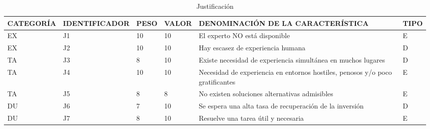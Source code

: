 \documentclass[a4paper,12pt]{article}
\begin{document}
\begin{table}[h]
	\centering
	\begin{tabular}{|l|l|l|l|p{4cm}|l|}
		\hline
		\scriptsize CATEGORÍA & \scriptsize IDENTIFICADOR & \scriptsize PESO & \scriptsize VALOR & \scriptsize DENOMINACIÓN DE LA CARACTERÍSTICA                                 & \scriptsize TIPO \\ \hline
		EX                    & J1                        & 10               & 10                & El experto NO está disponible                                                 & E                \\ \hline
		EX                    & J2                        & 10               & 10                & Hay escasez de experiencia humana                                             & D                \\ \hline
		TA                    & J3                        & 8                & 10                & Existe necesidad de experiencia simultánea en muchos lugares                  & D                \\ \hline
		TA                    & J4                        & 10               & 10                & Necesidad de experiencia en entornos hostiles, penosos y/o poco gratificantes & E                \\ \hline
		TA                    & J5                        & 8                & 8                 & No existen soluciones alternativas admisibles                                 & E                \\ \hline
		DU                    & J6                        & 7                & 10                & Se espera una alta tasa de recuperación de la inversión                       & D                \\ \hline
		DU                    & J7                        & 8                & 10                & Resuelve una tarea útil y necesaria                                           & E                \\ \hline
	\end{tabular}
	\caption{Justificación}
	\label{tab:justificacion}
\end{table}
\end{document}

